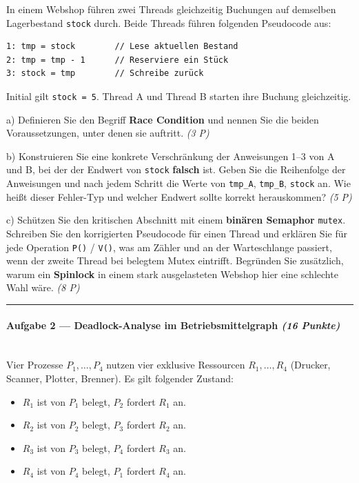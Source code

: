 \documentclass[11pt, a4paper]{article}
\begin{document}
In einem Webshop führen zwei Threads gleichzeitig Buchungen auf demselben Lagerbestand \texttt{stock} durch. Beide Threads führen folgenden Pseudocode aus:


\begin{lstlisting}
1: tmp = stock        // Lese aktuellen Bestand
2: tmp = tmp - 1      // Reserviere ein Stück
3: stock = tmp        // Schreibe zurück
\end{lstlisting}


Initial gilt \texttt{stock = 5}. Thread A und Thread B starten ihre Buchung gleichzeitig.


a) Definieren Sie den Begriff \textbf{Race Condition} und nennen Sie die beiden Voraussetzungen, unter denen sie auftritt. \textit{(3 P)}


b) Konstruieren Sie eine konkrete Verschränkung der Anweisungen 1–3 von A und B, bei der der Endwert von \texttt{stock} \textbf{falsch} ist. Geben Sie die Reihenfolge der Anweisungen und nach jedem Schritt die Werte von \texttt{tmp\_A}, \texttt{tmp\_B}, \texttt{stock} an. Wie heißt dieser Fehler-Typ und welcher Endwert sollte korrekt herauskommen? \textit{(5 P)}


c) Schützen Sie den kritischen Abschnitt mit einem \textbf{binären Semaphor} \texttt{mutex}. Schreiben Sie den korrigierten Pseudocode für einen Thread und erklären Sie für jede Operation \texttt{P()} / \texttt{V()}, was am Zähler und an der Warteschlange passiert, wenn der zweite Thread bei belegtem Mutex eintrifft. Begründen Sie zusätzlich, warum ein \textbf{Spinlock} in einem stark ausgelasteten Webshop hier eine schlechte Wahl wäre. \textit{(8 P)}



\noindent\textcolor{rulegray}{\rule{\linewidth}{0.4pt}}


\paragraph{Aufgabe 2 — Deadlock-Analyse im Betriebsmittelgraph \textit{(16 Punkte)}}\mbox{}\\[2pt]

Vier Prozesse $P_1,\ldots,P_4$ nutzen vier exklusive Ressourcen $R_1,\ldots,R_4$ (Drucker, Scanner, Plotter, Brenner). Es gilt folgender Zustand:


\begin{itemize}
  \item $R_1$ ist von $P_1$ belegt, $P_2$ fordert $R_1$ an.
  \item $R_2$ ist von $P_2$ belegt, $P_3$ fordert $R_2$ an.
  \item $R_3$ ist von $P_3$ belegt, $P_4$ fordert $R_3$ an.
  \item $R_4$ ist von $P_4$ belegt, $P_1$ fordert $R_4$ an.
\end{itemize}
\end{document}
